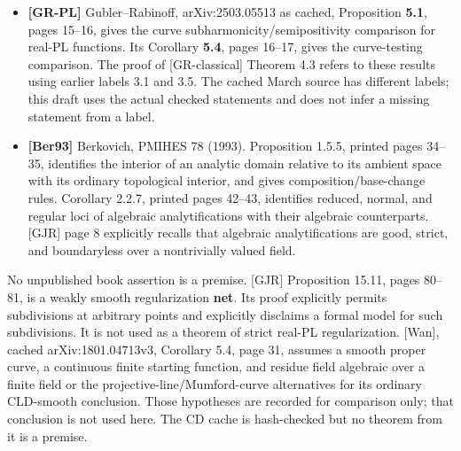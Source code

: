\documentclass[
  11pt,
]{article}
\begin{document}
\begin{itemize}
  domains for the real-PL G-topology. Lemma 5.4 gives morphism and
  scalar pullback. Proposition 5.11 gives descent of real-PL membership
  under a finite flat surjective morphism, with divisible coefficients,
  in particular \(\mathbb R\). Corollary 5.12 gives the corresponding
  field-extension statement for a completion of an algebraic extension,
  with its finite case explicitly deduced from 5.11. Sections 5.5--5.7
  identify integral model functions with strict PL functions and permit
  real linear combinations. Sections 15.3--15.4 give admissible
  subdivisions when all subdivision coordinates lie in the value group
  and vertical Cartier model functions for piecewise
  \((\mathbb Z,\Gamma)\)-linear skeletal functions. Section 15.8 gives
  strict domains for the corresponding subgraphs. Proposition 7.6 gives
  semipositivity under morphism and scalar pullback. These statements
  are checked on PDF pages 31--36, 45--47, and 77--80.
\item
  \textbf{{[}GR-PL{]}} Gubler--Rabinoff, arXiv:2503.05513 as cached,
  Proposition \textbf{5.1}, pages 15--16, gives the curve
  subharmonicity/semipositivity comparison for real-PL functions. Its
  Corollary \textbf{5.4}, pages 16--17, gives the curve-testing
  comparison. The proof of {[}GR-classical{]} Theorem 4.3 refers to
  these results using earlier labels 3.1 and 3.5. The cached March
  source has different labels; this draft uses the actual checked
  statements and does not infer a missing statement from a label.
\item
  \textbf{{[}Ber93{]}} Berkovich, PMIHES 78 (1993). Proposition 1.5.5,
  printed pages 34--35, identifies the interior of an analytic domain
  relative to its ambient space with its ordinary topological interior,
  and gives composition/base-change rules. Corollary 2.2.7, printed
  pages 42--43, identifies reduced, normal, and regular loci of
  algebraic analytifications with their algebraic counterparts.
  {[}GJR{]} page 8 explicitly recalls that algebraic analytifications
  are good, strict, and boundaryless over a nontrivially valued field.
\end{itemize}

No unpublished book assertion is a premise. {[}GJR{]} Proposition 15.11,
pages 80--81, is a weakly smooth regularization \textbf{net}. Its proof
explicitly permits subdivisions at arbitrary points and explicitly
disclaims a formal model for such subdivisions. It is not used as a
theorem of strict real-PL regularization. {[}Wan{]}, cached
arXiv:1801.04713v3, Corollary 5.4, page 31, assumes a smooth proper
curve, a continuous finite starting function, and residue field
algebraic over a finite field or the projective-line/Mumford-curve
alternatives for its ordinary CLD-smooth conclusion. Those hypotheses
are recorded for comparison only; that conclusion is not used here. The
CD cache is hash-checked but no theorem from it is a premise.
\end{document}
